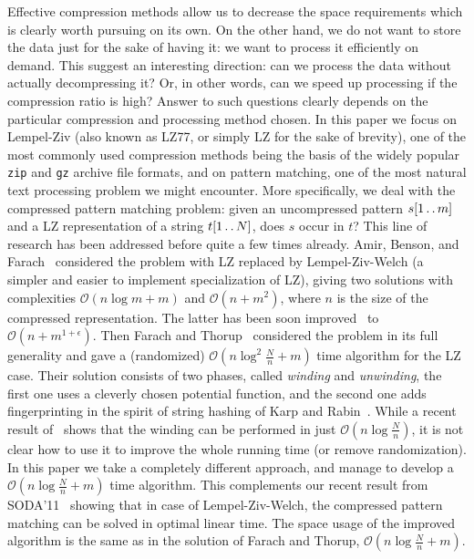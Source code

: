 \documentclass[runningheads]{llncs}
\newcommand{\twodots}{\mathinner{\ldotp\ldotp}}
\begin{document}
Effective compression methods allow us to decrease the space requirements which is clearly worth pursuing on its own. On the other hand, we do not want to store the data just for the sake of having it: we want to process it efficiently on demand. This suggest an interesting direction: can we process the data without actually decompressing it? Or, in other words, can we speed up processing if the compression ratio is high? Answer to such questions clearly depends on the particular compression and processing method chosen. In this paper we focus on Lempel-Ziv (also known as LZ77, or simply LZ for the sake of brevity), one of the most commonly used compression methods being the basis of the widely popular \texttt{zip} and \texttt{gz} archive file formats, and on pattern matching, one of the most natural text processing problem we might encounter. More specifically, we deal with the compressed pattern matching problem: given an uncompressed pattern $s[1\twodots m]$ and a LZ representation of a string $t[1\twodots N]$, does $s$ occur in $t$? This line of research has been addressed before quite a few times already. Amir, Benson, and Farach~\cite{Amir} considered the problem with LZ replaced by Lempel-Ziv-Welch (a simpler and easier to implement specialization of LZ), giving two solutions with complexities $\mathcal{O}(n\log m+m)$ and $\mathcal{O}(n+m^2)$, where $n$ is the size of the compressed representation. The latter has been soon improved~\cite{Kosaraju} to $\mathcal{O}(n+m^{1+\epsilon})$. Then Farach and Thorup~\cite{Farach} considered the problem in its full generality and gave a (randomized) $\mathcal{O}(n\log^2\frac{N}{n}+m)$ time algorithm for the LZ case. Their solution consists of two phases, called {\it winding} and {\it unwinding}, the first one uses a cleverly chosen potential function, and the second one adds fingerprinting in the spirit of string hashing of Karp and Rabin~\cite{KarpRabin}. While a recent result of~\cite{Iacono} shows that the winding can be performed in just $\mathcal{O}(n\log\frac{N}{n})$, it is not clear how to use it to improve the whole running time (or remove randomization).  In this paper we take a completely different approach, and manage to develop a $\mathcal{O}(n\log\frac{N}{n}+m)$ time algorithm. This complements our recent result from SODA'11~\cite{GawrychowskiLZW} showing that in case of Lempel-Ziv-Welch, the compressed pattern matching can be solved in optimal linear time. The space usage of the improved algorithm is the same as in the solution of Farach and Thorup, $\mathcal{O}(n\log\frac{N}{n}+m)$.
\end{document}
